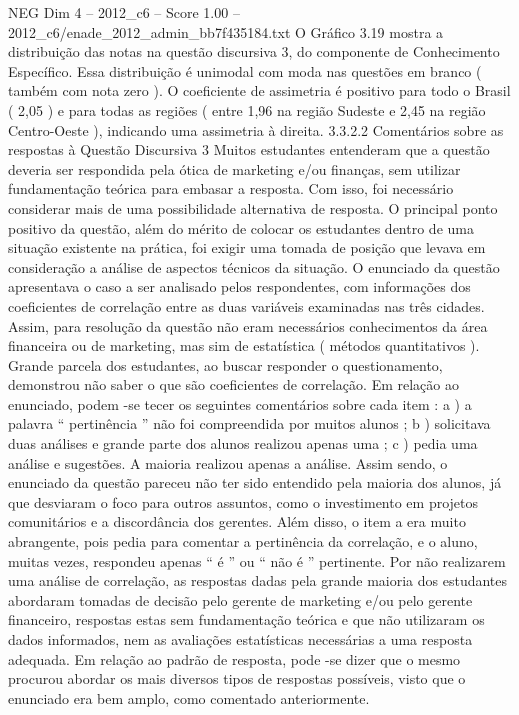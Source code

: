 \begin{textsample}{NEG Dim 4 – 2012\_c6 – Score 1.00 – 2012\_c6/enade\_2012\_admin\_bb7f435184.txt}
O Gráfico 3.19 mostra a distribuição das notas na questão discursiva 3, do componente de Conhecimento Específico.
Essa distribuição é unimodal com moda nas questões em branco ( também com nota zero ).
O coeficiente de assimetria é positivo para todo o Brasil ( 2,05 ) e para todas as regiões ( entre 1,96 na região Sudeste e 2,45 na região Centro-Oeste ), indicando uma assimetria à direita. 3.3.2.2 Comentários sobre as respostas à Questão Discursiva 3 Muitos estudantes entenderam que a questão deveria ser respondida pela ótica de marketing e/ou finanças, sem utilizar fundamentação teórica para embasar a resposta.
Com isso, foi necessário considerar mais de uma possibilidade alternativa de resposta.
O principal ponto positivo da questão, além do mérito de colocar os estudantes dentro de uma situação existente na prática, foi exigir uma tomada de posição que levava em consideração a análise de aspectos técnicos da situação.
O enunciado da questão apresentava o caso a ser analisado pelos respondentes, com informações dos coeficientes de correlação entre as duas variáveis examinadas nas três cidades.
Assim, para resolução da questão não eram necessários conhecimentos da área financeira ou de marketing, mas sim de estatística ( métodos quantitativos ).
Grande parcela dos estudantes, ao buscar responder o questionamento, demonstrou não saber o que são coeficientes de correlação.
Em relação ao enunciado, podem -se tecer os seguintes comentários sobre cada item : a ) a palavra “ pertinência ” não foi compreendida por muitos alunos ; b ) solicitava duas análises e grande parte dos alunos realizou apenas uma ; c ) pedia uma análise e sugestões.
A maioria realizou apenas a análise.
Assim sendo, o enunciado da questão pareceu não ter sido entendido pela maioria dos alunos, já que desviaram o foco para outros assuntos, como o investimento em projetos comunitários e a discordância dos gerentes.
Além disso, o item a era muito abrangente, pois pedia para comentar a pertinência da correlação, e o aluno, muitas vezes, respondeu apenas “ é ” ou “ não é ” pertinente.
Por não realizarem uma análise de correlação, as respostas dadas pela grande maioria dos estudantes abordaram tomadas de decisão pelo gerente de marketing e/ou pelo gerente financeiro, respostas estas sem fundamentação teórica e que não utilizaram os dados informados, nem as avaliações estatísticas necessárias a uma resposta adequada.
Em relação ao padrão de resposta, pode -se dizer que o mesmo procurou abordar os mais diversos tipos de respostas possíveis, visto que o enunciado era bem amplo, como comentado anteriormente.

\end{textsample}
